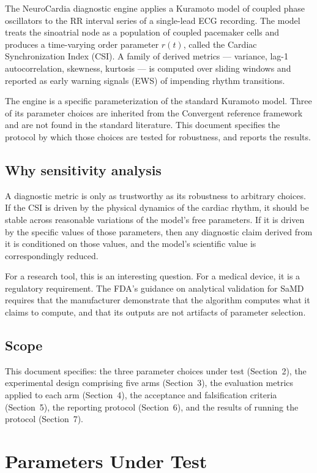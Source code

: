 \documentclass[11pt]{article}
\begin{document}
The NeuroCardia diagnostic engine applies a Kuramoto model of coupled
phase oscillators to the RR interval series of a single-lead ECG
recording. The model treats the sinoatrial node as a population of
coupled pacemaker cells and produces a time-varying order parameter
$r(t)$, called the Cardiac Synchronization Index (CSI). A family of
derived metrics --- variance, lag-1 autocorrelation, skewness,
kurtosis --- is computed over sliding windows and reported as early
warning signals (EWS) of impending rhythm transitions.

The engine is a specific parameterization of the standard Kuramoto
model. Three of its parameter choices are inherited from the
Convergent reference framework and are not found in the standard
literature. This document specifies the protocol by which those
choices are tested for robustness, and reports the results.

\subsection{Why sensitivity analysis}

A diagnostic metric is only as trustworthy as its robustness to
arbitrary choices. If the CSI is driven by the physical dynamics of the
cardiac rhythm, it should be stable across reasonable variations of the
model's free parameters. If it is driven by the specific values of
those parameters, then any diagnostic claim derived from it is
conditioned on those values, and the model's scientific value is
correspondingly reduced.

For a research tool, this is an interesting question. For a medical
device, it is a regulatory requirement. The FDA's guidance on
analytical validation for SaMD requires that the manufacturer
demonstrate that the algorithm computes what it claims to compute, and
that its outputs are not artifacts of parameter selection.

\subsection{Scope}

This document specifies: the three parameter choices under test
(Section~2), the experimental design comprising five arms
(Section~3), the evaluation metrics applied to each arm (Section~4),
the acceptance and falsification criteria (Section~5), the reporting
protocol (Section~6), and the results of running the protocol
(Section~7).

\section{Parameters Under Test}
\end{document}
